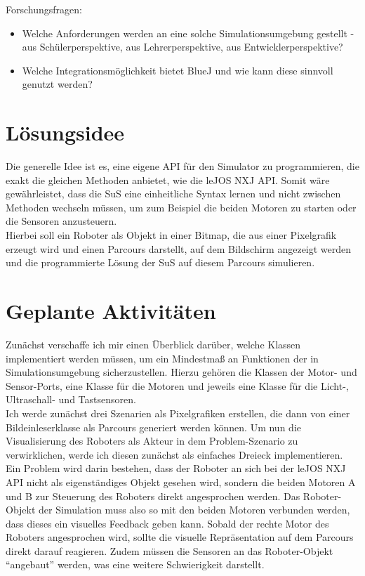 \documentclass[paper=a4, pagesize, DIV=calc, BCOR=12.5mm, twoside=off, onecolumn=on, open = any, titlepage =on, parskip =half-, headsepline = on, footsepline = on, chapterprefix = on, appendixprefix = off, fontsize = 12pt, numbers = noenddot, abstract = on]{scrbook}
\numberwithin{equation}{chapter}
\begin{document}
Forschungsfragen:\\
\begin{itemize}
\item Welche Anforderungen werden an eine solche Simulationsumgebung gestellt - aus Schülerperspektive, aus Lehrerperspektive, aus Entwicklerperspektive?
\item Welche Integrationsmöglichkeit bietet BlueJ und wie kann diese sinnvoll genutzt werden?
\end{itemize}

\par \singlespacing
\section*{Lösungsidee}
\onehalfspacing
Die generelle Idee ist es, eine eigene API für den Simulator zu programmieren, die exakt die gleichen Methoden anbietet, wie die leJOS NXJ API. Somit wäre gewährleistet, dass die SuS eine einheitliche Syntax lernen und nicht zwischen Methoden wechseln müssen, um zum Beispiel die beiden Motoren zu starten oder die Sensoren anzusteuern.\\
Hierbei soll ein Roboter als Objekt in einer Bitmap, die aus einer Pixelgrafik erzeugt wird und einen Parcours darstellt, auf dem Bildschirm angezeigt werden und die programmierte Lösung der SuS auf diesem Parcours simulieren.\\


\par \singlespacing
\section*{Geplante Aktivitäten}
\onehalfspacing
Zunächst verschaffe ich mir einen Überblick darüber, welche Klassen implementiert werden müssen, um ein Mindestmaß an Funktionen der in Simulationsumgebung sicherzustellen. Hierzu gehören die Klassen der Motor- und Sensor-Ports, eine Klasse für die Motoren und jeweils eine Klasse für die Licht-, Ultraschall- und Tastsensoren.\\
Ich werde zunächst drei Szenarien als Pixelgrafiken erstellen, die dann von einer Bildeinleserklasse als Parcours generiert werden können. Um nun die Visualisierung des Roboters als Akteur in dem Problem-Szenario zu verwirklichen, werde ich diesen zunächst als einfaches Dreieck implementieren.\\
Ein Problem wird darin bestehen, dass der Roboter an sich bei der leJOS NXJ API nicht als eigenständiges Objekt gesehen wird, sondern die beiden Motoren A und B zur Steuerung des Roboters direkt angesprochen werden. Das Roboter-Objekt der Simulation muss also so mit den beiden Motoren verbunden werden, dass dieses ein visuelles Feedback geben kann. Sobald der rechte Motor des Roboters angesprochen wird, sollte die visuelle Repräsentation auf dem Parcours direkt darauf reagieren. Zudem müssen die Sensoren an das Roboter-Objekt "`angebaut"' werden, was eine weitere Schwierigkeit darstellt. 
\end{document}
